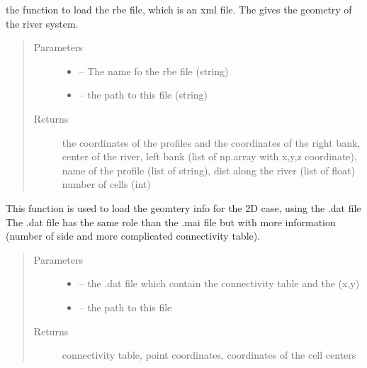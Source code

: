\documentclass[letterpaper,10pt,english]{sphinxmanual}
\begin{document}
\begin{fulllineitems}
\label{\detokenize{index:src.rubar.load_coord_1d}}
the function to load the rbe file, which is an xml file. The gives the geometry of the river system.
\begin{quote}\begin{description}
\item[{Parameters}] \leavevmode\begin{itemize}
\item {} 
 -- The name fo the rbe file (string)

\item {} 
 -- the path to this file (string)

\end{itemize}

\item[{Returns}] \leavevmode
the coordinates of the profiles and the coordinates of the right bank, center of the river, left bank
(list of np.array with x,y,z coordinate), name of the profile (list of string), dist along the river (list of float)
number of cells (int)

\end{description}\end{quote}

\end{fulllineitems}


\begin{fulllineitems}
\label{\detokenize{index:src.rubar.load_dat_2d}}
This  function is used to load the geomtery info for the 2D case, using the .dat file
The .dat file has the same role than the .mai file but with more information (number of side and more
complicated connectivity table).
\begin{quote}\begin{description}
\item[{Parameters}] \leavevmode\begin{itemize}
\item {} 
 -- the .dat file which contain the connectivity table and the (x,y)

\item {} 
 -- the path to this file

\end{itemize}

\item[{Returns}] \leavevmode
connectivity table, point coordinates, coordinates of the cell centers

\end{description}\end{quote}

\end{fulllineitems}
\end{document}
